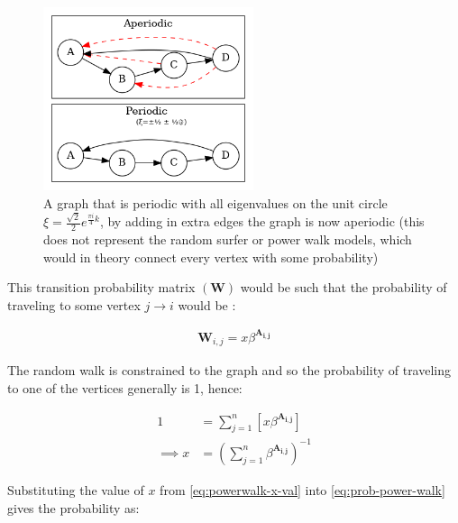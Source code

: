 \documentclass[11pt]{report}
\begin{document}
 \begin{figure}
 \includegraphics[width=0.55\textwidth]{media/dot/aperiodic.dot.png}
 \caption{\label{fig:aperiodic}A graph that is periodic with all eigenvalues on the unit circle \(\xi = \frac{\sqrt{2}}{2} e^{\frac{\pi i}{4} k}\), by adding in extra edges the graph is now aperiodic (this does not represent the random surfer or power walk models, which would in theory connect every vertex with some probability)}
\end{figure}

This transition probability matrix \(\left( \mathbf{W}\right)\) would be such that the probability of
traveling to some vertex \(j \rightarrow i\) would be \cite{parkPowerWalkRevisiting2013}:

\begin{align}
\mathbf{W}_{i, j} = x\beta^{\mathbf{A_{i,j}}} \label{eq:prob-power-walk}
\end{align}

The random walk is constrained to the graph and so the probability of traveling
to one of the vertices generally is 1, hence:


\begin{align}
      1 &= \sum^{n}_{j= 1}   \left[ x \beta^{\mathbf{A_{i,j}}} \right] \\
       \implies  x&= \left( \sum^{n}_{j= 1}   \beta^{\mathbf{A_{i,j}}}
       \right)^{-1} \label{eq:powerwalk-x-val}
\end{align}

Substituting the value of \(x\) from \eqref{eq:powerwalk-x-val} into \eqref{eq:prob-power-walk} gives the probability as:

\begin{align}
\end{align}
\end{document}

